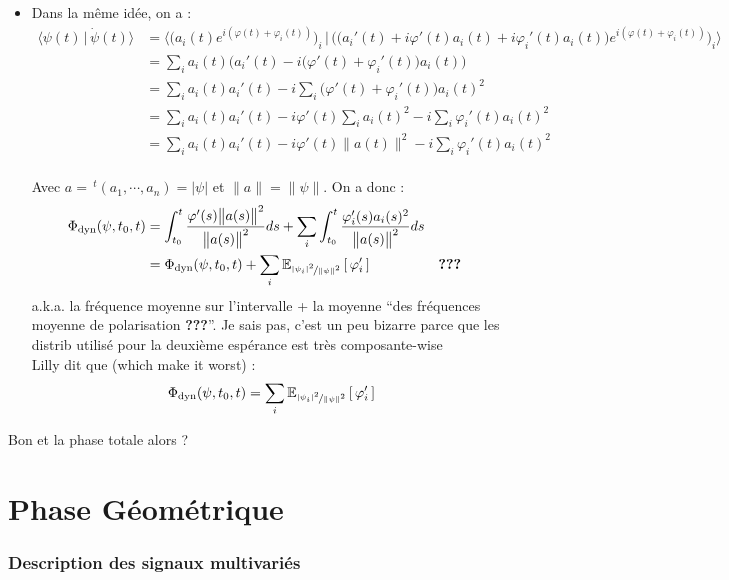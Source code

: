 \begin{itemize}
	\item Dans la même idée, on a :
	\begin{align*}
	\big\langle \psi(t) \,|\, \dot{\psi}(t) \big\rangle &= \Big\langle \Big(a_i(t)e^{i(\varphi(t)+\varphi_i(t))}\Big)_i \,|\, \Big(\big(a_i'(t)+i\varphi'(t)a_i(t) + i\varphi_i'(t)a_i(t)\big)e^{i(\varphi(t)+\varphi_i(t))}\Big)_i \Big\rangle \\
		&= \sum_i a_i(t) \Big(a_i'(t)-i\big(\varphi'(t) + \varphi_i'(t)\big)a_i(t)\Big) \\
		&= \sum_i a_i(t)a_i'(t)-i\sum_i \big(\varphi'(t) + \varphi_i'(t)\big)a_i(t)^2 \\
		&= \sum_i a_i(t)a_i'(t)-i \varphi'(t)\sum_ia_i(t)^2  - i\sum_i \varphi_i'(t)a_i(t)^2 \\
		&= \sum_i a_i(t)a_i'(t)-i \varphi'(t)\big\|a(t)\big\|^2  - i\sum_i \varphi_i'(t)a_i(t)^2
	\end{align*}
	\\
	Avec $a =\, ^t(a_1,\cdots, a_n)= |\psi|$ et $\|a\|=\|\psi\|$. On a donc :
	\begin{align*}
	\phased(\psi,t_0,t) &= \int_{t_0}^t \frac{\varphi'(s)\big\|a(s)\big\|^2}{\big\|a(s)\big\|^2} ds  + \sum_i\int_{t_0}^t \frac{\varphi_i'(s)a_i(s)^2}{\big\|a(s)\big\|^2} ds \\
		&=\phased(\psi,t_0,t)  + \sum_i \esp[\nicefrac{|\psi_i|^2}{\|\psi\|^2}]{\varphi_i'}    &  &\textbf{???}\\
	\end{align*}
	a.k.a. la fréquence moyenne sur l'intervalle + la moyenne ``des fréquences moyenne de polarisation \textbf{???}''. Je sais pas, c'est un peu bizarre parce que les distrib utilisé pour la deuxième espérance est très composante-wise
	\\
	Lilly \cite{lilly_analysis_2012} dit que (which make it worst) :
	\[\phased(\psi,t_0,t)  = \sum_i \esp[\nicefrac{|\psi_i|^2}{\|\psi\|^2}]{\varphi_i'}\]
\end{itemize}

Bon et la phase totale alors ?





\setcounter{figure}{0}
\setcounter{lstlisting}{0}

\part{Phase Géométrique}

\section{Description des signaux multivariés}\label{sec:bases}




